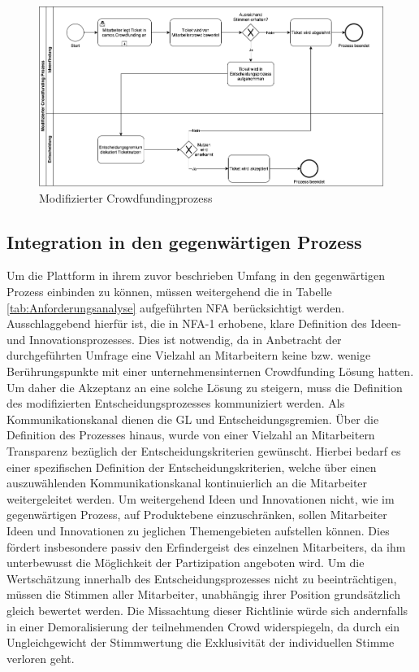 \begin{figure}[h]
	\centering
	\includegraphics[width=\textwidth]{images/ProcessBPMN}
	\caption{Modifizierter Crowdfundingprozess}
	\label{fig:processbpmn}
\end{figure} 

\newpage
\subsection*{Integration in den gegenwärtigen Prozess}
Um die Plattform in ihrem zuvor beschrieben Umfang in den gegenwärtigen Prozess einbinden zu können, müssen weitergehend die in Tabelle \ref{tab:Anforderungsanalyse} aufgeführten \acs{NFA} berücksichtigt werden. Ausschlaggebend hierfür ist, die in \ac{NFA}-1 erhobene, klare Definition des Ideen- und Innovationsprozesses. Dies ist notwendig, da in Anbetracht der durchgeführten Umfrage eine Vielzahl an Mitarbeitern keine bzw. wenige Berührungspunkte mit einer unternehmensinternen Crowdfunding Lösung hatten. Um daher die Akzeptanz an eine solche Lösung zu steigern, muss die Definition des modifizierten Entscheidungsprozesses kommuniziert werden. Als Kommunikationskanal dienen die \ac{GL} und Entscheidungsgremien. Über die Definition des Prozesses hinaus, wurde von einer Vielzahl an Mitarbeitern Transparenz bezüglich der Entscheidungskriterien gewünscht. Hierbei bedarf es einer spezifischen Definition der Entscheidungskriterien, welche über einen auszuwählenden Kommunikationskanal kontinuierlich an die Mitarbeiter weitergeleitet werden. Um weitergehend Ideen und Innovationen nicht, wie im gegenwärtigen Prozess, auf Produktebene einzuschränken, sollen Mitarbeiter Ideen und Innovationen zu jeglichen Themengebieten aufstellen können. Dies fördert insbesondere passiv den Erfindergeist des einzelnen Mitarbeiters, da ihm unterbewusst die Möglichkeit der Partizipation angeboten wird. Um die Wertschätzung innerhalb des Entscheidungsprozesses nicht zu beeinträchtigen, müssen die Stimmen aller Mitarbeiter, unabhängig ihrer Position grundsätzlich gleich bewertet werden. Die Missachtung dieser Richtlinie würde sich andernfalls in einer Demoralisierung der teilnehmenden Crowd widerspiegeln, da durch ein Ungleichgewicht der Stimmwertung die Exklusivität der individuellen Stimme verloren geht. 







